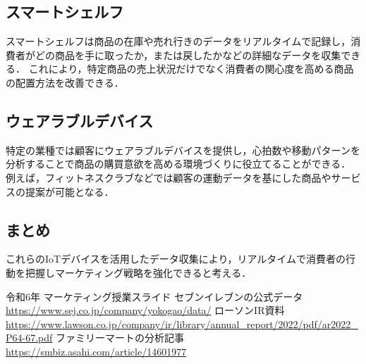 \documentclass[titlepage,a4paper]{jsarticle}
\begin{document}
\subsection{スマートシェルフ}
スマートシェルフは商品の在庫や売れ行きのデータをリアルタイムで記録し，消費者がどの商品を手に取ったか，または戻したかなどの詳細なデータを収集できる．
これにより，特定商品の売上状況だけでなく消費者の関心度を高める商品の配置方法を改善できる．

\subsection{ウェアラブルデバイス}
特定の業種では顧客にウェアラブルデバイスを提供し，心拍数や移動パターンを分析することで商品の購買意欲を高める環境づくりに役立てることができる．
例えば，フィットネスクラブなどでは顧客の運動データを基にした商品やサービスの提案が可能となる．

\subsection{まとめ}
これらのIoTデバイスを活用したデータ収集により，リアルタイムで消費者の行動を把握しマーケティング戦略を強化できると考える．






\begin{thebibliography}{99}
   令和6年 マーケティング授業スライド
   セブンイレブンの公式データ\url{https://www.sej.co.jp/company/yokogao/data/}
   ローソンIR資料\url{https://www.lawson.co.jp/company/ir/library/annual_report/2022/pdf/ar2022_P64-67.pdf}
   ファミリーマートの分析記事\url{https://smbiz.asahi.com/article/14601977}
\end{thebibliography}
\end{document}
